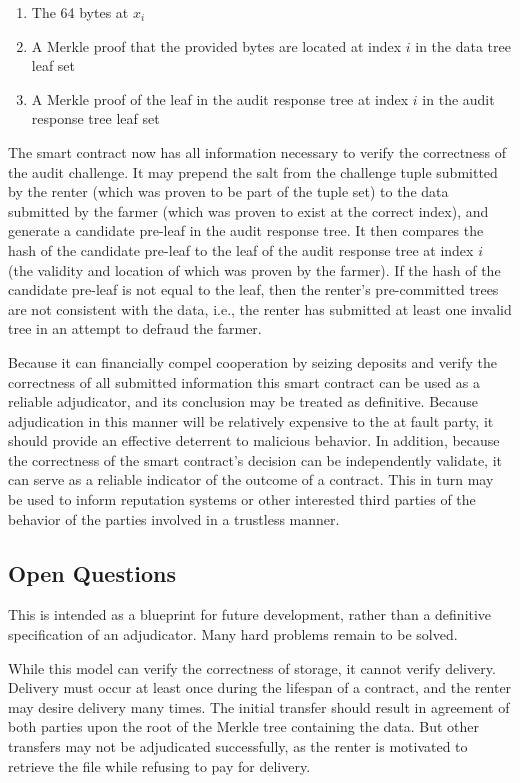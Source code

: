 \documentclass[a4paper,10pt]{article}
\begin{document}
\begin{enumerate}
  \item The 64 bytes at $ x_{i} $
  \item A Merkle proof that the provided bytes are located at index $ i $ in the data tree leaf set
  \item A Merkle proof of the leaf in the audit response tree at index $ i $ in the audit response tree leaf set
\end{enumerate}

The smart contract now has all information necessary to verify the correctness of the audit challenge. It may prepend the salt from the challenge tuple submitted by the renter (which was proven to be part of the tuple set) to the data submitted by the farmer (which was proven to exist at the correct index), and generate a candidate pre-leaf in the audit response tree. It then compares the hash of the candidate pre-leaf to the leaf of the audit response tree at index $ i $ (the validity and location of which was proven by the farmer). If the hash of the candidate pre-leaf is not equal to the leaf, then the renter's pre-committed trees are not consistent with the data, i.e., the renter has submitted at least one invalid tree in an attempt to defraud the farmer.

Because it can financially compel cooperation by seizing deposits and verify the correctness of all submitted information this smart contract can be used as a reliable adjudicator, and its conclusion may be treated as definitive. Because adjudication in this manner will be relatively expensive to the at fault party, it should provide an effective deterrent to malicious behavior. In addition, because the correctness of the smart contract's decision can be independently validate, it can serve as a reliable indicator of the outcome of a contract. This in turn may be used to inform reputation systems or other interested third parties of the behavior of the parties involved in a trustless manner.

\subsection{Open Questions}

This is intended as a blueprint for future development, rather than a definitive specification of an adjudicator. Many hard problems remain to be solved.

While this model can verify the correctness of storage, it cannot verify delivery. Delivery must occur at least once during the lifespan of a contract, and the renter may desire delivery many times. The initial transfer should result in agreement of both parties upon the root of the Merkle tree containing the data. But other transfers may not be adjudicated successfully, as the renter is motivated to retrieve the file while refusing to pay for delivery.
\end{document}

